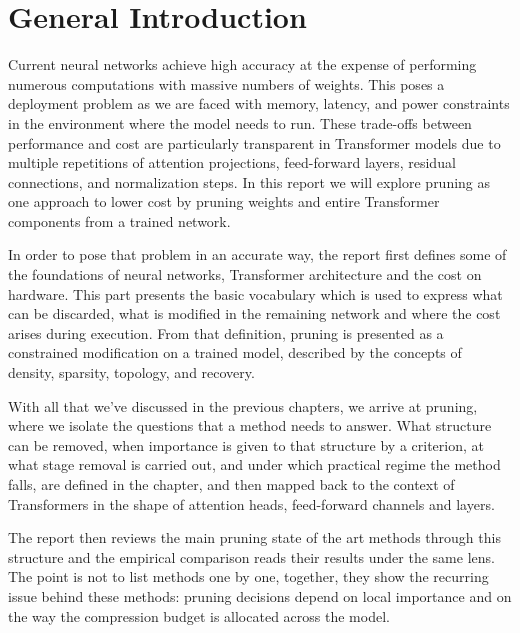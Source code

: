 \chapter*{General Introduction}
\label{chap:introduction}

Current neural networks achieve high accuracy at the expense of performing numerous computations with massive numbers of weights. This poses a deployment problem as we are faced with memory, latency, and power constraints in the environment where the model needs to run. These trade-offs between performance and cost are particularly transparent in Transformer models due to multiple repetitions of attention projections, feed-forward layers, residual connections, and normalization steps. In this report we will explore pruning as one approach to lower cost by pruning weights and entire Transformer components from a trained network.

In order to pose that problem in an accurate way, the report first defines some of the foundations of neural networks, Transformer architecture and the cost on hardware. This part presents the basic vocabulary which is used to express what can be discarded, what is modified in the remaining network and where the cost arises during execution. From that definition, pruning is presented as a constrained modification on a trained model, described by the concepts of density, sparsity, topology, and recovery.

With all that we've discussed in the previous chapters, we arrive at pruning, where we isolate the questions that a method needs to answer. What structure can be removed, when importance is given to that structure by a criterion, at what stage removal is carried out, and under which practical regime the method falls, are defined in the chapter, and then mapped back to the context of Transformers in the shape of attention heads, feed-forward channels and layers.


The report then reviews the main pruning state of the art methods through this structure and the empirical comparison reads their results under the same lens. The point is not to list methods one by one, together, they show the recurring issue
behind these methods: pruning decisions depend on local importance and on the way the compression budget is allocated across the model.
\clearpage
